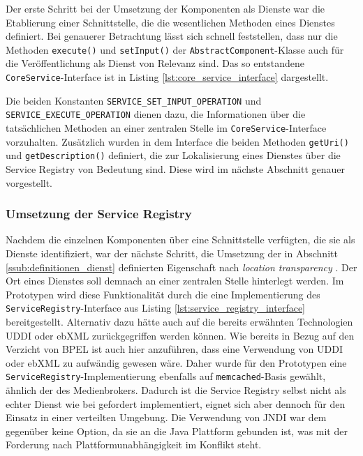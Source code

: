   Der erste Schritt bei der Umsetzung der Komponenten als Dienste war die Etablierung einer Schnittstelle, die die wesentlichen Methoden eines Dienstes definiert. Bei genauerer Betrachtung lässt sich schnell feststellen, dass nur die Methoden \verb!execute()! und \verb!setInput()! der \verb!AbstractComponent!-Klasse auch für die Veröffentlichung als Dienst von Relevanz sind. Das so entstandene \verb!CoreService!-Interface ist in Listing \ref{lst:core_service_interface} dargestellt.

  
  
  Die beiden Konstanten \verb!SERVICE_SET_INPUT_OPERATION! und \verb!SERVICE_EXECUTE_OPERATION! dienen dazu, die Informationen über die tatsächlichen Methoden an einer zentralen Stelle im \verb!CoreService!-Interface vorzuhalten. Zusätzlich wurden in dem Interface die beiden Methoden \verb!getUri()! und \verb!getDescription()! definiert, die zur Lokalisierung eines Dienstes über die Service Registry von Bedeutung sind. Diese wird im nächste Abschnitt genauer vorgestellt.

  
\subsubsection{Umsetzung der Service Registry} %
\label{ssub:umsetzung_der_service_registry}

  Nachdem die einzelnen Komponenten über eine Schnittstelle verfügten, die sie als Dienste identifiziert, war der nächste Schritt, die Umsetzung der in Abschnitt \ref{ssub:definitionen_dienst} definierten Eigenschaft nach \emph{location transparency} \citep{service_oriented_computing}. Der Ort eines Dienstes soll demnach an einer zentralen Stelle hinterlegt werden. Im Prototypen wird diese Funktionalität durch die eine Implementierung des \verb!ServiceRegistry!-Interface aus Listing \ref{lst:service_registry_interface} bereitgestellt. Alternativ dazu hätte auch auf die bereits erwähnten Technologien UDDI oder ebXML zurückgegriffen werden können. Wie bereits in Bezug auf den Verzicht von BPEL ist auch hier anzuführen, dass eine Verwendung von UDDI oder ebXML zu aufwändig gewesen wäre. Daher wurde für den Prototypen eine \verb!ServiceRegistry!-Implementierung ebenfalls auf \verb!memcached!-Basis gewählt, ähnlich der des Medienbrokers. Dadurch ist die Service Registry selbst nicht als echter Dienst wie bei \citep{service_oriented_computing} gefordert implementiert, eignet sich aber dennoch für den Einsatz in einer verteilten Umgebung. Die Verwendung von JNDI war dem gegenüber keine Option, da sie an die Java Plattform gebunden ist, was mit der Forderung nach Plattformunabhängigkeit \citep{service_oriented_computing} im Konflikt steht.

